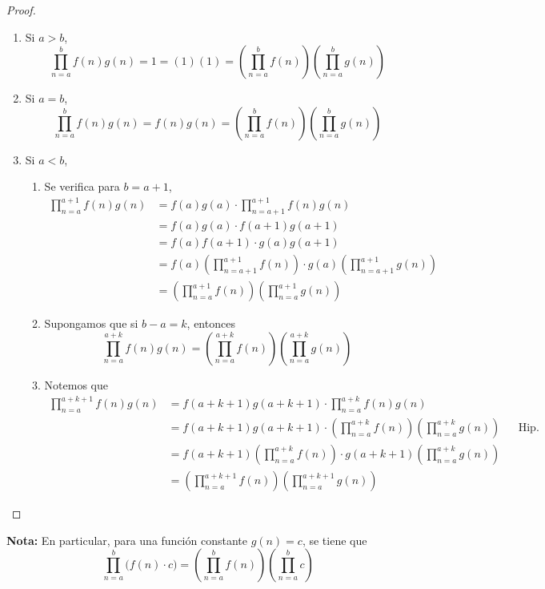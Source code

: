 \begin{enumerate}[label=\alph*)]
    \begin{proof}\leavevmode
      \begin{enumerate}[label=\Roman*)]
        \item Si $a>b$, \[\prod_{n=a}^{b} f(n) g(n) = 1 = (1)(1) = \left(\prod_{n=a}^{b} f(n)\right) \left(\prod_{n=a}^{b} g(n)\right)\]
        \item Si $a=b$, \[\prod_{n=a}^{b} f(n) g(n) = f(n)g(n) = \left(\prod_{n=a}^{b} f(n)\right) \left(\prod_{n=a}^{b} g(n)\right)\]
        \item Si $a<b$,
        \begin{enumerate}[label=\roman*)]
          \item Se verifica para $b=a+1$,
          \begin{align*}
            \prod_{n=a}^{a+1} f(n) g(n) &= f(a) g(a) \cdot \prod_{n=a+1}^{a+1} f(n) g(n)\\
            &= f(a) g(a) \cdot f(a+1) g(a+1)\\
            &= f(a)f(a+1) \cdot g(a)g(a+1)\\
            &= f(a) \left(\prod_{n=a+1}^{a+1} f(n)\right) \cdot g(a) \left(\prod_{n=a+1}^{a+1} g(n)\right)\\
            &= \left(\prod_{n=a}^{a+1} f(n)\right) \left(\prod_{n=a}^{a+1} g(n)\right)
          \end{align*}
          \item Supongamos que si $b-a=k$, entonces
          \[\prod_{n=a}^{a+k} f(n) g(n) = \left(\prod_{n=a}^{a+k} f(n)\right) \left(\prod_{n=a}^{a+k} g(n)\right)\]
          \item Notemos que
          \begin{align*}
            \prod_{n=a}^{a+k+1} f(n) g(n) &= f(a+k+1)g(a+k+1) \cdot \prod_{n=a}^{a+k} f(n) g(n)\\
            &= f(a+k+1)g(a+k+1) \cdot \left(\prod_{n=a}^{a+k} f(n)\right) \left(\prod_{n=a}^{a+k} g(n)\right) && \text{Hip. Ind.}\\
            &=f(a+k+1) \left(\prod_{n=a}^{a+k} f(n)\right)  \cdot g(a+k+1) \left(\prod_{n=a}^{a+k} g(n)\right)\\
            &= \left(\prod_{n=a}^{a+k+1} f(n)\right) \left(\prod_{n=a}^{a+k+1} g(n)\right)
          \end{align*}
        \end{enumerate}
      \end{enumerate}
    \end{proof}
    
    \textbf{Nota:} En particular, para una función constante $g(n)=c$, se tiene que \[\prod_{n=a}^{b} \big(f(n) \cdot c\big) = \left(\prod_{n=a}^{b} f(n)\right) \left(\prod_{n=a}^{b} c\right)\]
    

\end{enumerate}
